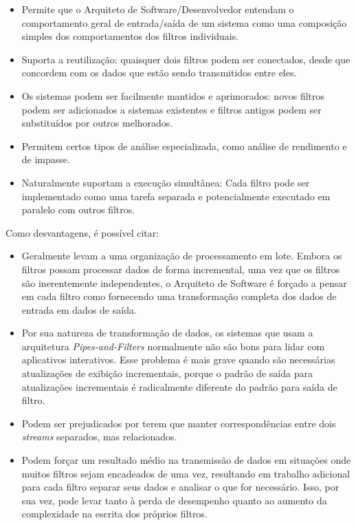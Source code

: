 \documentclass[Portugues,Final]{ic-tese-v3}
\begin{document}
\begin{itemize}
\item Permite que o Arquiteto de Software/Desenvolvedor entendam o comportamento geral de entrada/saída de um sistema como uma composição simples dos comportamentos dos filtros individuais.
\item Suporta a reutilização: quaisquer dois filtros podem ser conectados, desde que concordem com os dados que estão sendo transmitidos entre eles. 
\item Os sistemas podem ser facilmente mantidos e aprimorados: novos filtros podem ser adicionados a sistemas existentes e filtros antigos podem ser substituídos por outros melhorados.
\item Permitem certos tipos de análise especializada, como análise de rendimento e de impasse.
\item Naturalmente suportam a execução simultânea: Cada filtro pode ser implementado como uma tarefa separada e potencialmente executado em paralelo com outros filtros.
\end{itemize}

Como desvantagens, é possível citar:

\begin{itemize}
\item Geralmente levam a uma organização de processamento em lote. Embora os filtros possam processar dados de forma incremental, uma vez que os filtros são inerentemente independentes, o Arquiteto de Software é forçado a pensar em cada filtro como fornecendo uma transformação completa dos dados de entrada em dados de saída. 
\item Por sua natureza de transformação de dados, os sistemas que usam a arquitetura \textit{Pipes-and-Filters} normalmente não são bons para lidar com aplicativos interativos. Esse problema é mais grave quando são necessárias atualizações de exibição incrementais, porque o padrão de saída para atualizações incrementais é radicalmente diferente do padrão para saída de filtro.
\item Podem ser prejudicados por terem que manter correspondências entre dois \textit{streams} separados, mas relacionados. 
\item Podem forçar um resultado médio na transmissão de dados em situações onde muitos filtros sejam encadeados de uma vez, resultando em trabalho adicional para cada filtro separar seus dados e analisar o que for necessário. Isso, por sua vez, pode levar tanto à perda de desempenho quanto ao aumento da complexidade na escrita dos próprios filtros.
\end{itemize}
\end{document}
